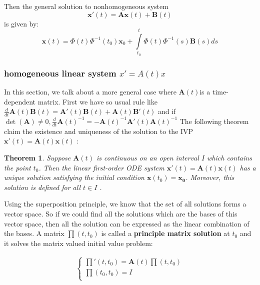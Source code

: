 \documentclass[a4paper]{article}
\newtheorem{theorem}{Theorem}
\begin{document}
Then the general solution to nonhomogeneous system \[\mathbf{x'}(t)=\mathbf{Ax}(t)+\mathbf{B}(t)\]is given by:
\begin{equation}
\mathbf{x}(t)=\Phi (t){{\Phi }^{-1}}({{t}_{0}}){{\mathbf{x}}_{0}}+\int\limits_{{{t}_{0}}}^{t}{\Phi (t){{\Phi }^{-1}}(s)\mathbf{B}(s)ds}
\end{equation}

\subsubsection{homogeneous linear system $x'=A(t)x$}
In this section, we talk about a more general case where $\mathbf{A}(t)$is a time-dependent matrix.
First we have so usual rule like $\frac{d}{dt}\mathbf{A}(t)\mathbf{B}(t)=\mathbf{A}'(t)\mathbf{B}(t)+\mathbf{A}(t)\mathbf{B}'(t)$ and if $\det (\mathbf{A})\ne 0,\frac{d}{dt}\mathbf{A}{{(t)}^{-1}}=-\mathbf{A}{{(t)}^{-1}}\mathbf{A}'(t)\mathbf{A}{{(t)}^{-1}}$
The following theorem claim the existence and uniqueness of the solution to the IVP $\mathbf{x'}(t)=\mathbf{A}(t)\mathbf{x}(t)$ :

\begin{theorem}
Suppose $\mathbf{A}(t)$ is continuous on an open interval $I$ which contains the point ${{t}_{0}}$. Then the linear first-order ODE system $\mathbf{x'}(t)=\mathbf{A}(t)\mathbf{x}(t)$ has a unique solution satisfying the initial condition $\mathbf{x}({{t}_{0}})={{\mathbf{x}}_{\mathbf{0}}}$. Moreover, this solution is defined for all $t\in I$ .
\end{theorem}

Using the superposition principle, we know that the set of all solutions forms a vector space. So if we could find all the solutions which are the bases of this vector space, then all the solution can be expressed as the linear combination of the bases.
A matrix $\prod (t,{{t}_{0}})$  is called a \textbf{principle matrix solution} at ${{t}_{0}}$ and it solves the matrix valued initial value problem:

\begin{eqnarray}     %
\left\{                       %
\begin{array}{lll}       %
\prod '(t,{{t}_{0}})=\mathbf{A}(t)\prod (t,{{t}_{0}}) \\
\prod ({{t}_{0}},{{t}_{0}})=I \\
\end{array}              %
\right.                       %
\end{eqnarray}
\end{document}
